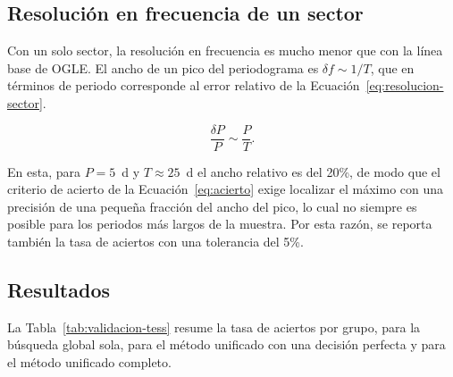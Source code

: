 \documentclass[12pt,letterpaper,oneside]{book}
\begin{document}
\subsection{Resoluci\'on en frecuencia de un sector}
\label{sec:validacion-resolucion}

Con un solo sector, la resoluci\'on en frecuencia es mucho menor que con la l\'inea base de OGLE. El ancho de un pico del periodograma es $\delta f\sim1/T$, que en t\'erminos de periodo corresponde al error relativo de la Ecuaci\'on~\eqref{eq:resolucion-sector}.

\begin{equation}
	\frac{\delta P}{P} \sim \frac{P}{T}.
	\label{eq:resolucion-sector}
\end{equation}

En esta, para $P=5$~d y $T\approx25$~d el ancho relativo es del 20\%, de modo que el criterio de acierto de la Ecuaci\'on~\eqref{eq:acierto} exige localizar el m\'aximo con una precisi\'on de una peque\~na fracci\'on del ancho del pico, lo cual no siempre es posible para los periodos m\'as largos de la muestra. Por esta raz\'on, se reporta tambi\'en la tasa de aciertos con una tolerancia del 5\%.

\subsection{Resultados}

La Tabla~\ref{tab:validacion-tess} resume la tasa de aciertos por grupo, para la b\'usqueda global sola, para el m\'etodo unificado con una decisi\'on perfecta y para el m\'etodo unificado completo.
\end{document}
